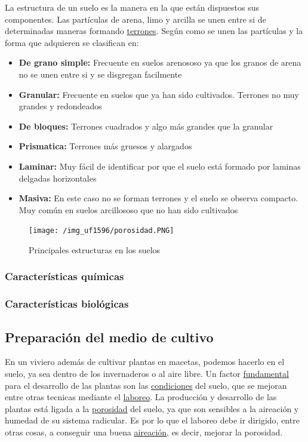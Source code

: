 \documentclass[a4paper,12pt,oneside]{article}
\begin{document}
La estructura de un suelo es la manera en la que están dispuestos sus
componentes. Las partículas de arena, limo y arcilla se unen entre si de
determinadas maneras formando \uline{terrones}. Según como se unen las partículas y la
forma que adquieren se clasifican en:
\begin{itemize}
\item \textbf{De grano simple:} Frecuente en suelos arenososo ya que los granos
de arena no se unen entre si y se disgregan facilmente
\item \textbf{Granular:} Frecuente en suelos que ya han sido cultivados. Terrones no muy
grandes y redondeados
\item \textbf{De bloques:} Terrones cuadrados y algo más grandes que la granular
\item \textbf{Prismatica:} Terrones más gruesos y alargados
\item \textbf{Laminar:} Muy fácil de identificar por que el suelo está formado por laminas
delgadas horizontales
\item \textbf{Masiva:} En este caso no se forman terrones y el suelo se observa
compacto. Muy común en suelos arcillososo que no han sido cultivados
\end{itemize}
\begin{center}
\begin{figure}[htbp]
\centering
\texttt{[image: /img\_uf1596/porosidad.PNG]}
\caption{Principales estructuras en los suelos}
\end{figure}
\end{center}
\subsubsection{Características químicas}
\label{sec:orgc1fdc22}
\subsubsection{Características biológicas}
\label{sec:orgb7259bc}
\subsection{Preparación del medio de cultivo}
\label{sec:orgba50308}
En un viviero además de cultivar plantas en macetas, podemos hacerlo en el
suelo, ya sea dentro de los invernaderos o al aire libre. Un factor \uline{fundamental}
para el desarrollo de las plantas son las \uline{condiciones} del suelo, que se mejoran
entre otras tecnicas mediante el \uline{laboreo}.
La producción y desarrollo de las plantas está ligada a la \uline{porosidad} del
suelo, ya que son sensibles a la aireación y humedad de su sistema radicular. Es
por lo que el laboreo debe ir dirigido, entre otras cosas, a conseguir una buena
\uline{aireación}, es decir, mejorar la porosidad.
\end{document}
